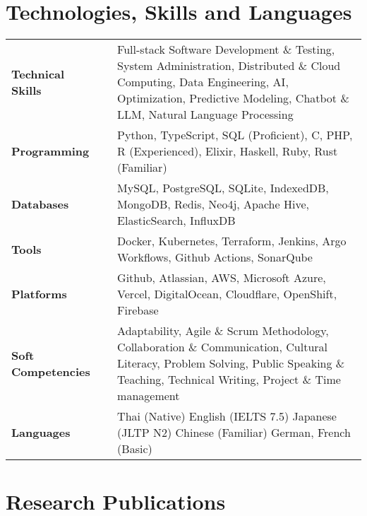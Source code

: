 \documentclass{article}
\newcommand{\hskills}[1]{
\textbf{\bfseries #1} }
\begin{document}
    \section{Technologies, Skills and Languages}
    \vspace{-0.2cm}
    \begin{tabular}{p{11em} p{1em} p{48em}}
        \hskills{Technical Skills}&  & Full-stack Software Development \& Testing, System Administration, Distributed \& Cloud Computing, \vfill
            Data Engineering, AI, Optimization, Predictive Modeling, Chatbot \& LLM, Natural Language Processing \\
        \hskills{Programming}&  & Python, TypeScript, SQL (Proficient), C, PHP, R (Experienced), Elixir, Haskell, Ruby, Rust (Familiar) \\
        \hskills{Databases}&  & MySQL, PostgreSQL, SQLite, IndexedDB, MongoDB, Redis, Neo4j, Apache Hive, ElasticSearch, InfluxDB \\
        \hskills{Tools}&  & Docker, Kubernetes, Terraform, Jenkins, Argo Workflows, Github Actions, SonarQube \\
        \hskills{Platforms}&  & Github, Atlassian, AWS, Microsoft Azure, Vercel, DigitalOcean, Cloudflare, OpenShift, Firebase \\
        \hskills{Soft Competencies}&  & Adaptability, Agile \& Scrum Methodology, Collaboration \& Communication, Cultural Literacy, \vfill
            Problem Solving, Public Speaking \& Teaching, Technical Writing, Project \& Time management \\
        \hskills{Languages}&  & Thai (Native) English (IELTS 7.5) Japanese (JLTP N2) Chinese (Familiar) German, French (Basic) \\
    \end{tabular}

    \vspace{-0.4cm}
    \section{Research Publications}
    \vspace{-0.2cm}
    \renewcommand\refname{\vskip -2em}
    \nocite{*}
    \printbibliography[heading=none]
    \vspace{-0.4cm}
\end{document}
